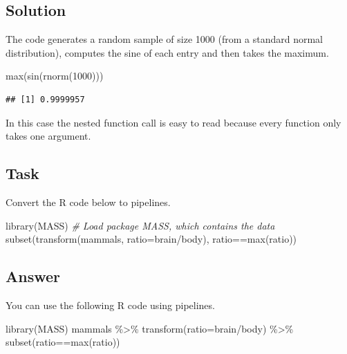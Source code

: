 \documentclass[
]{book}
\newenvironment{Shaded}{\begin{snugshade}}{\end{snugshade}}
\newcommand{\AttributeTok}[1]{\textcolor[rgb]{0.77,0.63,0.00}{#1}}
\newcommand{\CommentTok}[1]{\textcolor[rgb]{0.56,0.35,0.01}{\textit{#1}}}
\newcommand{\DecValTok}[1]{\textcolor[rgb]{0.00,0.00,0.81}{#1}}
\newcommand{\FunctionTok}[1]{\textcolor[rgb]{0.00,0.00,0.00}{#1}}
\newcommand{\NormalTok}[1]{#1}
\newcommand{\SpecialCharTok}[1]{\textcolor[rgb]{0.00,0.00,0.00}{#1}}
\begin{document}
\hypertarget{solution}{%
\subsection{Solution}\label{solution}}

The code generates a random sample of size 1000 (from a standard normal distribution), computes the sine of each entry and then takes the maximum.

\begin{Shaded}
\begin{Highlighting}[]
\FunctionTok{max}\NormalTok{(}\FunctionTok{sin}\NormalTok{(}\FunctionTok{rnorm}\NormalTok{(}\DecValTok{1000}\NormalTok{)))}
\end{Highlighting}
\end{Shaded}

\begin{verbatim}
## [1] 0.9999957
\end{verbatim}

In this case the nested function call is easy to read because every function only takes one argument.

\hypertarget{task-1}{%
\subsection{Task}\label{task-1}}

Convert the R code below to pipelines.

\begin{Shaded}
\begin{Highlighting}[]
\FunctionTok{library}\NormalTok{(MASS)                       }\CommentTok{\# Load package MASS, which contains the data}
\FunctionTok{subset}\NormalTok{(}\FunctionTok{transform}\NormalTok{(mammals, }\AttributeTok{ratio=}\NormalTok{brain}\SpecialCharTok{/}\NormalTok{body), ratio}\SpecialCharTok{==}\FunctionTok{max}\NormalTok{(ratio))}
\end{Highlighting}
\end{Shaded}

\hypertarget{answer}{%
\subsection{Answer}\label{answer}}

You can use the following R code using pipelines.

\begin{Shaded}
\begin{Highlighting}[]
\FunctionTok{library}\NormalTok{(MASS)}
\NormalTok{mammals }\SpecialCharTok{\%\textgreater{}\%}
  \FunctionTok{transform}\NormalTok{(}\AttributeTok{ratio=}\NormalTok{brain}\SpecialCharTok{/}\NormalTok{body) }\SpecialCharTok{\%\textgreater{}\%}
  \FunctionTok{subset}\NormalTok{(ratio}\SpecialCharTok{==}\FunctionTok{max}\NormalTok{(ratio))}
\end{Highlighting}
\end{Shaded}
\end{document}
